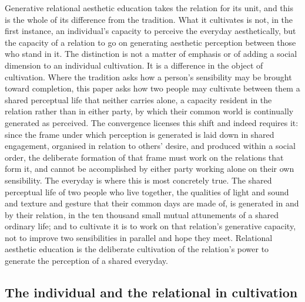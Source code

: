 Generative relational aesthetic education takes the relation for its unit, and this is the whole of its difference from the tradition. What it cultivates is not, in the first instance, an individual's capacity to perceive the everyday aesthetically, but the capacity of a relation to go on generating aesthetic perception between those who stand in it. The distinction is not a matter of emphasis or of adding a social dimension to an individual cultivation. It is a difference in the object of cultivation. Where the tradition asks how a person's sensibility may be brought toward completion, this paper asks how two people may cultivate between them a shared perceptual life that neither carries alone, a capacity resident in the relation rather than in either party, by which their common world is continually generated as perceived. The convergence licenses this shift and indeed requires it: since the frame under which perception is generated is laid down in shared engagement, organised in relation to others' desire, and produced within a social order, the deliberate formation of that frame must work on the relations that form it, and cannot be accomplished by either party working alone on their own sensibility. The everyday is where this is most concretely true. The shared perceptual life of two people who live together, the qualities of light and sound and texture and gesture that their common days are made of, is generated in and by their relation, in the ten thousand small mutual attunements of a shared ordinary life; and to cultivate it is to work on that relation's generative capacity, not to improve two sensibilities in parallel and hope they meet. Relational aesthetic education is the deliberate cultivation of the relation's power to generate the perception of a shared everyday.

\subsection{The individual and the relational in cultivation}
\label{p23:sub:edu-dialectic}

